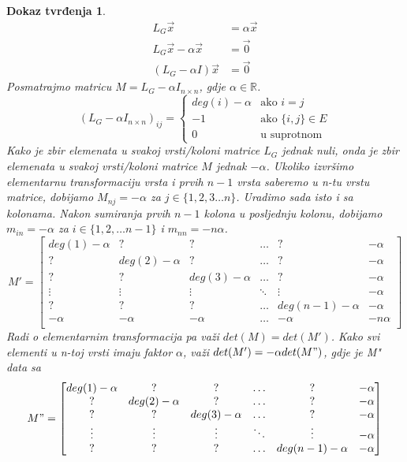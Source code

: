 \documentclass[11pt]{article}
\newtheorem*{custom_proof}{Dokaz tvrđenja}
\begin{document}
\begin{custom_proof}
		\[
			\begin{split}
				L_G \vec{x} &= \alpha \vec{x} \\
				L_G \vec{x} - \alpha \vec{x} &= \vec{0}  \\
				(L_G - \alpha I) \vec{x} &= \vec{0}  
			\end{split}
		\]
		Posmatrajmo matricu $ M = L_G - \alpha I_{n \times n}$, gdje $\alpha \in \mathbb{R}$.
		\[
				 (L_G - \alpha I_{n \times n})_{ij} =
				 \begin{cases}
				 deg(i) - \alpha  & \text{ako } i = j \\
				 -1 & \text{ako } \{i,j\} \in E \\ 
				 0  & \text{u suprotnom}
				 \end{cases}
		\]
		Kako je zbir elemenata u svakoj vrsti/koloni matrice $L_G$ jednak nuli, onda je zbir elemenata u svakoj vrsti/koloni matrice $M$ jednak $-\alpha$.
		Ukoliko izvršimo elementarnu transformaciju vrsta i prvih $n-1$ vrsta saberemo u n-tu vrstu matrice, dobijamo  $M_{nj} = -\alpha$ za $ j \in \{1,2,3 \dots n\}$.
		Uradimo sada isto i sa kolonama. Nakon sumiranja prvih $n-1$ kolona u posljednju kolonu, dobijamo $m_{in} = -\alpha$ za $i \in \{1,2, \dots n-1\}$ i $m_{nn} = -n \alpha$.
		\[
			M' =\begin{bmatrix}
				deg(1) - \alpha & ? & ? & \dots & ? & -\alpha \\
				? & deg(2) - \alpha & ? & \dots & ? & -\alpha \\
				? & ? & deg(3) - \alpha & \dots & ? & -\alpha \\
				\vdots & \vdots & \vdots & \ddots & \vdots & -\alpha \\
				? & ? & ? & \dots &deg(n-1) - \alpha & -\alpha \\
				-\alpha & -\alpha & -\alpha & \dots &-\alpha & -n \alpha \\
		\end{bmatrix}
		\]
		Radi o elementarnim transformacija pa važi $det(M) = det(M')$.
		Kako svi elementi u n-toj vrsti imaju faktor $\alpha$, važi $det(M')=-\alpha det(M")$, gdje je M" data sa
		\[
			M" =\begin{bmatrix}
				deg(1) - \alpha & ? & ? & \dots & ? & -\alpha \\
				? & deg(2) - \alpha & ? & \dots & ? & -\alpha \\
				? & ? & deg(3) - \alpha & \dots & ? & -\alpha \\
				\vdots & \vdots & \vdots & \ddots & \vdots & -\alpha \\
				? & ? & ? & \dots &deg(n-1) - \alpha & -\alpha \\

\end{bmatrix}\]
\end{custom_proof}
\end{document}
